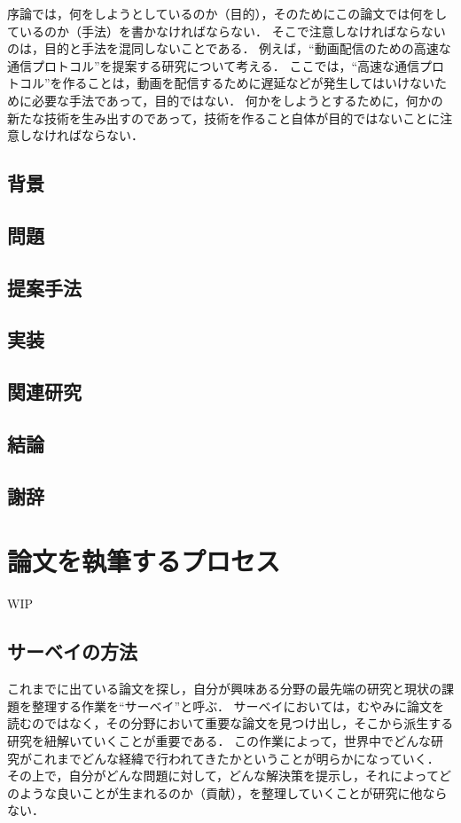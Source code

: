 序論では，何をしようとしているのか（目的），そのためにこの論文では何をしているのか（手法）を書かなければならない．
そこで注意しなければならないのは，目的と手法を混同しないことである．
例えば，``動画配信のための高速な通信プロトコル''を提案する研究について考える．
ここでは，``高速な通信プロトコル''を作ることは，動画を配信するために遅延などが発生してはいけないために必要な手法であって，目的ではない．
何かをしようとするために，何かの新たな技術を生み出すのであって，技術を作ること自体が目的ではないことに注意しなければならない．


\subsection{背景}
\subsection{問題}
\subsection{提案手法}
\subsection{実装}
\subsection{関連研究}
\subsection{結論}
\subsection{謝辞}

\section{論文を執筆するプロセス}
\label{background:process}
WIP
\subsection{サーベイの方法}
\label{backgorund:servey}
これまでに出ている論文を探し，自分が興味ある分野の最先端の研究と現状の課題を整理する作業を``サーベイ''と呼ぶ．
サーベイにおいては，むやみに論文を読むのではなく，その分野において重要な論文を見つけ出し，そこから派生する研究を紐解いていくことが重要である．
この作業によって，世界中でどんな研究がこれまでどんな経緯で行われてきたかということが明らかになっていく．
その上で，自分がどんな問題に対して，どんな解決策を提示し，それによってどのような良いことが生まれるのか（貢献），を整理していくことが研究に他ならない．

